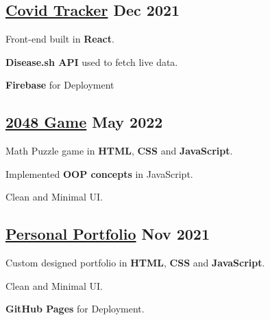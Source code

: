 \subsection{{\href{https://alias-covid-tracker.web.app/}{Covid Tracker} \hfill Dec 2021}}
\begin{zitemize}
\item Front-end built in \textbf{React}.
\item \textbf{Disease.sh API} used to fetch live data.
\item \textbf{Firebase} for Deployment
\end{zitemize}

\subsection{{\href{https://thepranaygupta.github.io/2048-Game/}{2048 Game} \hfill May 2022}}
\begin{zitemize}
\item Math Puzzle game in \textbf{HTML}, \textbf{CSS} and \textbf{JavaScript}.
\item Implemented \textbf{OOP concepts} in JavaScript.
\item Clean and Minimal UI.
\end{zitemize}

\subsection{{\href{https://thepranaygupta.github.io/}{Personal Portfolio} \hfill Nov 2021}}
\begin{zitemize}
\item Custom designed portfolio in \textbf{HTML}, \textbf{CSS} and \textbf{JavaScript}.
\item Clean and Minimal UI.
\item \textbf{GitHub Pages} for Deployment.
\end{zitemize}


